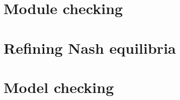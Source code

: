 \documentclass{article}
\theoremstyle{definition}
\theoremstyle{plain}
\begin{document}
\section{Module checking}
\label{section:module}


\section{Refining Nash equilibria}
\label{section:nash}


\section{Model checking \SLref}
\label{section:mc}




\end{document}
